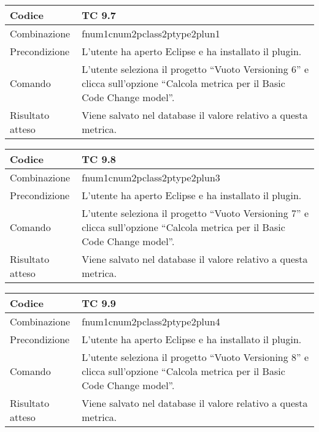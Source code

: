 \begin{table}[ht]
\begin{tabular}{|p{3cm}|p{9cm}|}
\hline
\cellcolor{lightgray}Codice				& TC 9.7								\\
\hline
\cellcolor{lightgray}Combinazione		& fnum1cnum2pclass2ptype2plun1									\\
\hline
\cellcolor{lightgray}Precondizione		& L'utente ha aperto Eclipse e ha installato il plugin.		\\
\hline
\cellcolor{lightgray}Comando			& L'utente seleziona il progetto ``Vuoto Versioning 6''  e clicca sull'opzione ``Calcola metrica per il Basic Code Change model''.	\\
\hline
\cellcolor{lightgray}Risultato atteso	& Viene salvato nel database il valore relativo a questa metrica.\\
\hline
\end{tabular}
\end{table}

\begin{table}[ht]
\begin{tabular}{|p{3cm}|p{9cm}|}
\hline
\cellcolor{lightgray}Codice				& TC 9.8								\\
\hline
\cellcolor{lightgray}Combinazione		& fnum1cnum2pclass2ptype2plun3									\\
\hline
\cellcolor{lightgray}Precondizione		& L'utente ha aperto Eclipse e ha installato il plugin.		\\
\hline
\cellcolor{lightgray}Comando			& L'utente seleziona il progetto ``Vuoto Versioning 7''  e clicca sull'opzione ``Calcola metrica per il Basic Code Change model''.	\\
\hline
\cellcolor{lightgray}Risultato atteso	& Viene salvato nel database il valore relativo a questa metrica.\\
\hline
\end{tabular}
\end{table}

\begin{table}[ht]
\begin{tabular}{|p{3cm}|p{9cm}|}
\hline
\cellcolor{lightgray}Codice				& TC 9.9								\\
\hline
\cellcolor{lightgray}Combinazione		& fnum1cnum2pclass2ptype2plun4									\\
\hline
\cellcolor{lightgray}Precondizione		& L'utente ha aperto Eclipse e ha installato il plugin.		\\
\hline
\cellcolor{lightgray}Comando			& L'utente seleziona il progetto ``Vuoto Versioning 8''  e clicca sull'opzione ``Calcola metrica per il Basic Code Change model''.	\\
\hline
\cellcolor{lightgray}Risultato atteso	& Viene salvato nel database il valore relativo a questa metrica.\\
\hline
\end{tabular}
\end{table}

